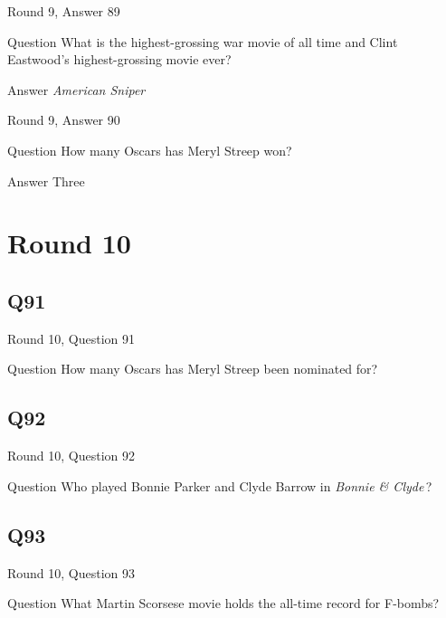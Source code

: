 \documentclass[11pt]{beamer}
\begin{document}
\begin{frame}[t]{Round 9, Answer 89}
\vspace{2em}
\begin{block}{Question}
What is the highest-grossing war movie of all time and Clint Eastwood's highest-grossing movie ever?
\end{block}
\pause{}
\begin{block}{Answer}
\emph{American Sniper}
\end{block}
\end{frame}
    

\begin{frame}[t]{Round 9, Answer 90}
\vspace{2em}
\begin{block}{Question}
How many Oscars has Meryl Streep won?
\end{block}
\pause{}
\begin{block}{Answer}
Three
\end{block}
\end{frame}
    

\section{Round 10}
    

\subsection*{Q91}
\begin{frame}[t]{Round 10, Question 91}
\vspace{2em}
\begin{block}{Question}
How many Oscars has Meryl Streep been nominated for?
\end{block}
\end{frame}
    

\subsection*{Q92}
\begin{frame}[t]{Round 10, Question 92}
\vspace{2em}
\begin{block}{Question}
Who played Bonnie Parker and Clyde Barrow in \emph{Bonnie \& Clyde}\,?
\end{block}
\end{frame}
    

\subsection*{Q93}
\begin{frame}[t]{Round 10, Question 93}
\vspace{2em}
\begin{block}{Question}
What Martin Scorsese movie holds the all-time record for F-bombs?
\end{block}
\end{frame}
    
\end{document}
